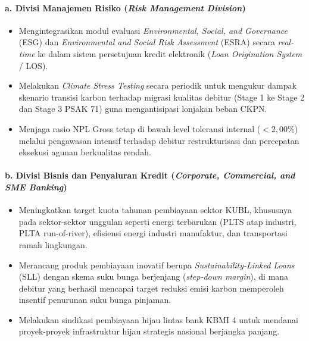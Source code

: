 \documentclass[12pt,a4paper]{article}
\numberwithin{equation}{section}
\begin{document}
\paragraph{a. Divisi Manajemen Risiko (\emph{Risk Management Division})}
\begin{itemize}
  \item Mengintegrasikan modul evaluasi \emph{Environmental, Social, and Governance} (ESG) dan \emph{Environmental and Social Risk Assessment} (ESRA) secara \emph{real-time} ke dalam sistem persetujuan kredit elektronik (\emph{Loan Origination System} / LOS).
  \item Melakukan \emph{Climate Stress Testing} secara periodik untuk mengukur dampak skenario transisi karbon terhadap migrasi kualitas debitur (Stage 1 ke Stage 2 dan Stage 3 PSAK 71) guna mengantisipasi lonjakan beban CKPN.
  \item Menjaga rasio NPL Gross tetap di bawah level toleransi internal ($<2{,}00\%$) melalui pengawasan intensif terhadap debitur restrukturisasi dan percepatan eksekusi agunan berkualitas rendah.
\end{itemize}

\paragraph{b. Divisi Bisnis dan Penyaluran Kredit (\emph{Corporate, Commercial, and SME Banking})}
\begin{itemize}
  \item Meningkatkan target kuota tahunan pembiayaan sektor KUBL, khususnya pada sektor-sektor unggulan seperti energi terbarukan (PLTS atap industri, PLTA run-of-river), efisiensi energi industri manufaktur, dan transportasi ramah lingkungan.
  \item Merancang produk pembiayaan inovatif berupa \emph{Sustainability-Linked Loans} (SLL) dengan skema suku bunga berjenjang (\emph{step-down margin}), di mana debitur yang berhasil mencapai target reduksi emisi karbon memperoleh insentif penurunan suku bunga pinjaman.
  \item Melakukan sindikasi pembiayaan hijau lintas bank KBMI 4 untuk mendanai proyek-proyek infrastruktur hijau strategis nasional berjangka panjang.
\end{itemize}
\end{document}
